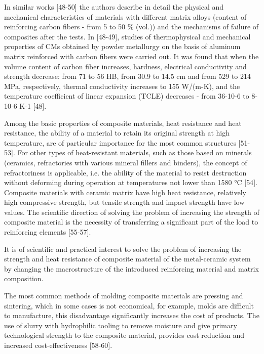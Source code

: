 \begin{multicols}{2}
In similar works {[}48-50{]} the authors describe in detail the physical
and mechanical characteristics of materials with different matrix alloys
(content of reinforcing carbon fibers - from 5 to 50 \% (vol.)) and the
mechanisms of failure of composites after the tests. In {[}48-49{]},
studies of thermophysical and mechanical properties of CMs obtained by
powder metallurgy on the basis of aluminum matrix reinforced with carbon
fibers were carried out. It was found that when the volume content of
carbon fiber increases, hardness, electrical conductivity and strength
decrease: from 71 to 56 HB, from 30.9 to 14.5 cm and from 529 to 214
MPa, respectively, thermal conductivity increases to 155 W/(m-K), and
the temperature coefficient of linear expansion (TCLE) decreases - from
36-10-6 to 8-10-6 K-1 {[}48{]}.

Among the basic properties of composite materials, heat resistance and
heat resistance, the ability of a material to retain its original
strength at high temperature, are of particular importance for the most
common structures {[}51-53{]}. For other types of heat-resistant
materials, such as those based on minerals (ceramics, refractories with
various mineral fillers and binders), the concept of refractoriness is
applicable, i.e. the ability of the material to resist destruction
without deforming during operation at temperatures not lower than 1580
°C {[}54{]}. Composite materials with ceramic matrix have high heat
resistance, relatively high compressive strength, but tensile strength
and impact strength have low values. The scientific direction of solving
the problem of increasing the strength of composite material is the
necessity of transferring a significant part of the load to reinforcing
elements {[}55-57{]}.

It is of scientific and practical interest to solve the problem of
increasing the strength and heat resistance of composite material of the
metal-ceramic system by changing the macrostructure of the introduced
reinforcing material and matrix composition.

The most common methods of molding composite materials are pressing and
sintering, which in some cases is not economical, for example, molds are
difficult to manufacture, this disadvantage significantly increases the
cost of products. The use of slurry with hydrophilic tooling to remove
moisture and give primary technological strength to the composite
material, provides cost reduction and increased cost-effectiveness
{[}58-60{]}.


\end{multicols}
